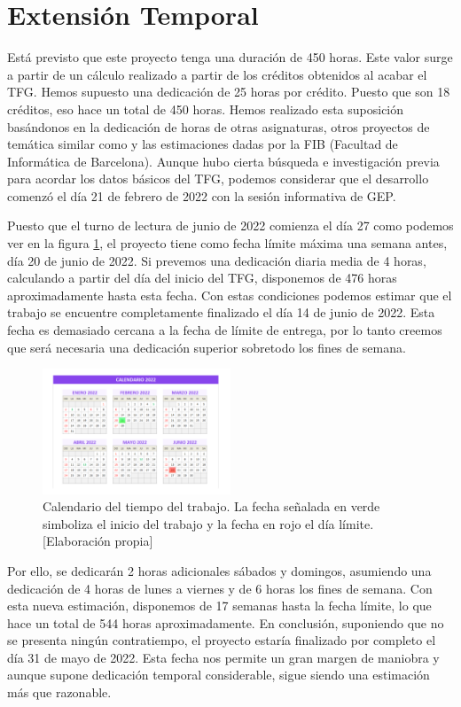 \section{Extensión Temporal}
Está previsto que este proyecto tenga una duración de 450 horas. Este valor surge a partir de un cálculo realizado a partir de los créditos obtenidos al acabar el TFG. Hemos supuesto una dedicación de 25 horas por crédito. Puesto que son 18 créditos, eso hace un total de 450 horas. Hemos realizado esta suposición basándonos en la dedicación de horas de otras asignaturas, otros proyectos de temática similar como \cite{wow-upc} \cite{netlogo} y las estimaciones dadas por la FIB (Facultad de Informática de Barcelona)\cite{fib_tfg}. Aunque hubo cierta búsqueda e investigación previa para acordar los datos básicos del TFG, podemos considerar que el desarrollo comenzó el día 21 de febrero de 2022 con la sesión informativa de GEP.   

Puesto que el turno de lectura de junio de 2022 comienza el día 27 \cite{fib_tfg} como podemos ver en la figura \ref{fig:fechas}, el proyecto tiene como fecha límite máxima una semana antes, día 20 de junio de 2022. Si prevemos una dedicación diaria media de 4 horas, calculando a partir del día del inicio del TFG, disponemos de 476 horas aproximadamente hasta esta fecha. Con estas condiciones podemos estimar que el trabajo se encuentre completamente finalizado el día 14 de junio de 2022. Esta fecha es demasiado cercana a la fecha de límite de entrega, por lo tanto creemos que será necesaria una dedicación superior sobretodo los fines de semana.  

\begin{figure}[h]
    \centering
    \includegraphics[width=0.5\textwidth]{img/fechas.png}
    \caption{Calendario del tiempo del trabajo. La fecha señalada en verde simboliza el inicio del trabajo y la fecha en rojo el día límite. [Elaboración propia]}
    \label{fig:fechas}
\end{figure}

Por ello, se dedicarán 2 horas adicionales sábados y domingos, asumiendo una dedicación de 4 horas de lunes a viernes y de 6 horas los fines de semana. Con esta nueva estimación, disponemos de 17 semanas hasta la fecha límite, lo que hace un total de 544 horas aproximadamente. En conclusión, suponiendo que no se presenta ningún contratiempo, el proyecto estaría finalizado por completo el día 31 de mayo de 2022. Esta fecha nos permite un gran margen de maniobra y aunque supone dedicación temporal considerable, sigue siendo una estimación más que razonable.



